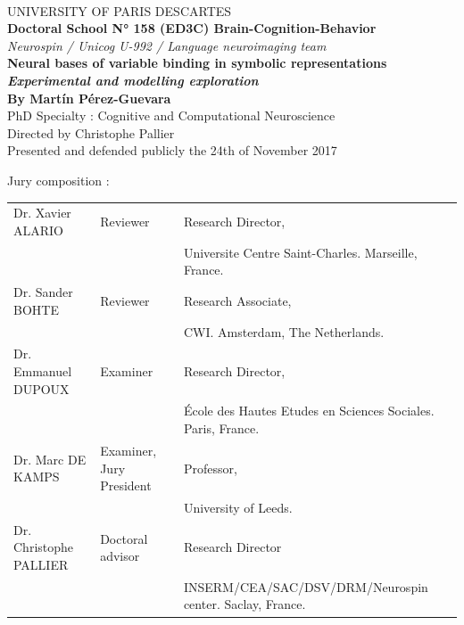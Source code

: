 \documentclass[twoside, justified, notoc, nobib, 
	nohyper]{tufte-book}
\begin{document}
\begin{fullwidth}
    ~\\[1cm]
\begin{center}
\vspace*{1.00cm}
UNIVERSITY OF PARIS DESCARTES \\
\vspace*{0.25cm}
\textbf{Doctoral School N° 158 (ED3C) Brain-Cognition-Behavior}\\
\vspace*{0,25cm}
\textit{Neurospin / Unicog U-992 / Language neuroimaging team}\\
\vspace*{2cm}
\LARGE{\textbf{Neural bases of variable binding in symbolic representations}}\\
\vspace*{0,5cm}
\large{\textit{\textbf{Experimental and modelling exploration}}}\\
\vspace*{0.5cm}
\large{\textbf{By Mart\'in P\'erez-Guevara}}\\
\vspace*{0.5cm}
PhD Specialty : Cognitive and Computational Neuroscience\\
\vspace*{0.5cm}
Directed by Christophe Pallier\\
\vspace*{0.5cm}
\small{Presented and defended publicly the 24th of November 2017}\\
\end{center}

\vspace*{1cm}
\begin{footnotesize}
Jury composition : \\[0.25cm]
\begin{tabular}{lll}
Dr. Xavier ALARIO & Reviewer & Research Director,\\ & & Universite Centre Saint-Charles. Marseille, France.\\
Dr. Sander BOHTE & Reviewer & Research Associate,\\ & &  CWI. Amsterdam, The Netherlands.\\
Dr. Emmanuel DUPOUX & Examiner & Research Director,\\ & &  École des Hautes Etudes en Sciences Sociales. Paris, France.\\
Dr. Marc DE KAMPS & Examiner, Jury President & Professor,\\ & & University of Leeds.\\
Dr. Christophe PALLIER & Doctoral advisor & Research Director\\& & INSERM/CEA/SAC/DSV/DRM/Neurospin center. Saclay, France.\\
\end{tabular}
\end{footnotesize}


\end{fullwidth}
\end{document}
